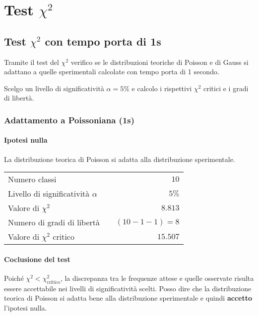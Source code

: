 \documentclass{article}
\begin{document}
\section{Test \(\chi^2\)}
\subsection{Test \(\chi^2\) con tempo porta di 1s}
Tramite il test del \(\chi^2\) verifico se le distribuzioni teoriche di Poisson e di Gauss si adattano a quelle sperimentali calcolate con tempo porta di 1 secondo.

Scelgo un livello di significatività $\alpha = 5\%$ e calcolo i rispettivi $\chi^2$ critici e i gradi di libertà.


\subsubsection{Adattamento a Poissoniana (1s)}
\paragraph{Ipotesi nulla} La distribuzione teorica di Poisson si adatta alla distribuzione sperimentale.

\vspace{0.2cm}
\begin{center}
\begin{tabular}{lr}
	Numero classi & $10$ \\
	Livello di significatività $\alpha$		& $ \quad 5\%$  \\
	Valore di $\chi ^2$             	& $\quad 8.813$       \\
	Numero di gradi di libertà      	& $\quad (10-1-1) = 8$         \\   
	Valore di $\chi ^2$ critico     	& $\quad 15.507$
\end{tabular}
\end{center}

\paragraph{Coclusione del test} Poiché $\chi^2 < \chi^2_{\text{critico}}$, la discrepanza tra le frequenze attese e quelle osservate risulta essere accettabile nei livelli di significatività scelti. Posso dire che la distribuzione teorica di Poisson si adatta bene alla distribuzione sperimentale e quindi \textbf{accetto} l'ipotesi nulla.
\end{document}
